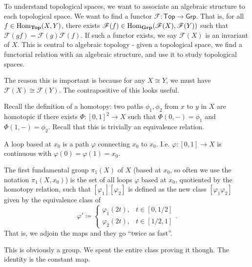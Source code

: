 To understand topological spaces, we want to associate an algebraic structure to each topological space. We want to find a functor $\mathscr{F} :\mathsf{Top} \to \mathsf{Grp} $. That is, for all $f\in \operatorname{Hom}_{\mathbf{Top} }(X, Y) $, there exists $\mathscr{F} (f)\in \operatorname{Hom}_{\mathbf{Grp} }(\mathscr{F} (X), \mathscr{F} (Y)) $ such that $\mathscr{F} (gf)=\mathscr{F} (g)\mathscr{F} (f)$. If such a functor exists, we say $\mathscr{F} (X)$ is an invariant of $X$. This is central to algebraic topology - given a topological space, we find a functorial relation with an algebraic structure, and use it to study topological spaces.

The reason this is important is because for any $X\cong Y$, we must have $\mathscr{F} (X)\cong \mathscr{F} (Y)$. The contrapositive of this looks useful.

Recall the definition of a homotopy: two paths $\phi _1,\phi _2$ from $x$ to $y$ in $X$ are homotopic if there exists $\Phi : [0,1]^2 \to X$ such that $\Phi (0,-)=\phi _1$ and $\Phi (1,-)=\phi _2$. Recall that this is trivially an equivalence relation.

\begin{definition}[Loop]\label{dfn:6.2}
	A loop based at $x_0$ is a path $\varphi $ connecting $x_0$ to $x_0$. I.e. $\varphi : [0,1] \to X$ is continuous with $\varphi (0)=\varphi (1)=x_0$.
\end{definition}
\begin{definition}\label{dfn:6.3}
	The first fundamental group $\pi _1(X)$ of $X$ (based at $x_0$, so often we use the notation $\pi _1(X,x_0)$) is the set of all loops $\varphi $ based at $x_0$, quotiented by the homotopy relation, such that $[\varphi _1] [ \varphi _2]$ is defined as the new class $[\varphi _1\varphi _2]$ given by the equivalence class of
	\[
		\varphi '\coloneqq \begin{cases}
			\varphi _1(2t),&t\in [0,1/2]\\
			\varphi _2(2t),&t\in [1/2,1]
		\end{cases}
	.\]
	That is, we adjoin the maps and they go ``twice as fast''.
\end{definition}

This is obviously a group. We spent the entire class proving it though. The identity is the constant map. 
